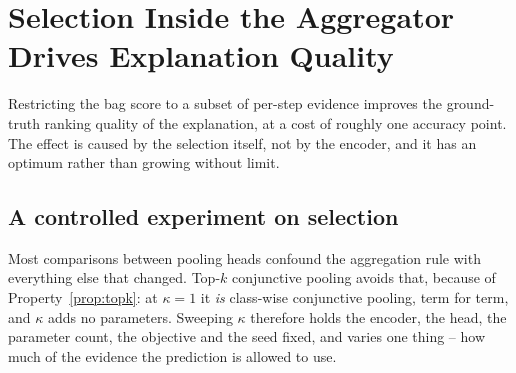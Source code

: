 %

\section{Selection Inside the Aggregator Drives Explanation Quality}
\label{sec:selection}

\begin{finding}
\label{find:selection}
Restricting the bag score to a subset of per-step evidence improves the ground-truth ranking quality
of the explanation, at a cost of roughly one accuracy point. The effect is caused by the selection
itself, not by the encoder, and it has an optimum rather than growing without limit.
\end{finding}

\subsection{A controlled experiment on selection}
\label{sec:selection:kappa}

Most comparisons between pooling heads confound the aggregation rule with everything else that
changed. Top-$k$ conjunctive pooling avoids that, because of Property~\ref{prop:topk}: at
$\kappa = 1$ it \emph{is} class-wise conjunctive pooling, term for term, and $\kappa$ adds no
parameters. Sweeping $\kappa$ therefore holds the encoder, the head, the parameter count, the
objective and the seed fixed, and varies one thing -- how much of the evidence the prediction is
allowed to use.

